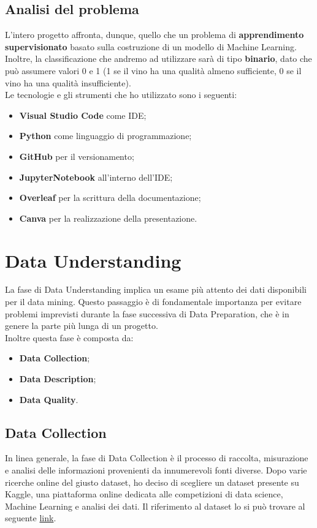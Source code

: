 \documentclass{article}
\begin{document}
\begin{titlepage}
        \subsection{Analisi del problema}
        L'intero progetto affronta, dunque, quello che un problema di \textbf{apprendimento supervisionato} basato sulla costruzione di un modello di Machine Learning. 
        Inoltre, la classificazione che andremo ad utilizzare sarà di tipo \textbf{binario}, dato che può assumere valori 0 e 1 (1 se il vino ha una qualità almeno sufficiente, 0 se il vino ha una qualità insufficiente). \\
        Le tecnologie e gli strumenti che ho utilizzato sono i seguenti:
        \begin{itemize}
            \item \textbf{Visual Studio Code} come IDE;
            \item \textbf{Python} come linguaggio di programmazione;
            \item \textbf{GitHub} per il versionamento;
            \item \textbf{JupyterNotebook} all’interno dell’IDE;
            \item \textbf{Overleaf} per la scrittura della documentazione;
            \item \textbf{Canva} per la realizzazione della presentazione.
        \end{itemize}

        \newpage
        \section{Data Understanding}
        La fase di Data Understanding implica un esame più attento dei dati disponibili per il data mining. Questo passaggio è di fondamentale importanza per evitare problemi imprevisti durante la fase successiva di Data Preparation, che è in genere la parte più lunga di un progetto. \\
        Inoltre questa fase è composta da:
        \begin{itemize}
            \item \textbf{Data Collection};
            \item \textbf{Data Description};
            \item \textbf{Data Quality}.
        \end{itemize}

         \subsection{Data Collection}
         In linea generale, la fase di Data Collection è il processo di raccolta, misurazione e analisi delle informazioni provenienti da innumerevoli fonti diverse. Dopo varie ricerche online del giusto dataset, ho deciso di scegliere un dataset presente su Kaggle,  una piattaforma online dedicata alle competizioni di data science, Machine Learning e analisi dei dati. Il riferimento al dataset lo si può trovare al seguente \href{https://www.kaggle.com/datasets/uciml/red-wine-quality-cortez-et-al-2009}{link}.


\end{titlepage}
\end{document}
